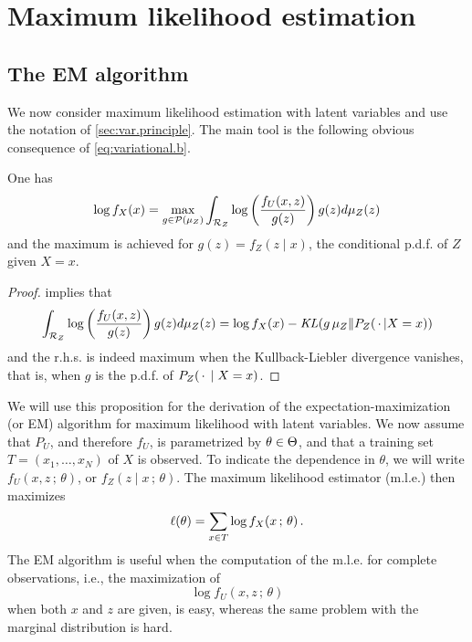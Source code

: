 \section{Maximum likelihood estimation}

%
% 

\subsection{The EM algorithm}
We now consider maximum likelihood estimation with latent variables and use the notation of \cref{sec:var.principle}. The main tool is the following obvious consequence of \cref{eq:variational.b}.
 \begin{proposition}
 \label{prop:var.bayes}
 One has
 \[
\log f_X(x) = \max_{g\in {\mathcal P}(\mu_Z)} \int_{{\mathcal R}_Z} \log \left(\frac{f_U(x,
z)}{g(z)}\right) g(z) d\mu_Z(z)
\]  
and the maximum is achieved for $g(z) = f_Z(z\mid x)$, the conditional p.d.f. of $Z$ given $X=x$.
 \end{proposition}
 \begin{proof}
  implies that 
 \[
 \int_{{\mathcal R}_Z} \log \left(\frac{f_U(x,
z)}{g(z)}\right) g(z) d\mu_Z(z) = \log f_X(x) - \mathit{KL}(g\,\mu_Z\|P_Z(\,\cdot\,|X=x))
\]
and the r.h.s. is indeed maximum when the Kullback-Liebler divergence vanishes, that is, when $g$ is the p.d.f. of  $P_Z(\,\cdot\,\mid X=x)$.
\end{proof}

We will use this proposition for the derivation of the expectation-maxi\-mi\-zation (or EM) algorithm for maximum likelihood with latent variables. We now assume that  
 $P_U$, and therefore $f_U$, is parametrized by $\theta\in \Theta$, and that a training set  $T = (x_1, \ldots, x_N)$ of $X$ is observed. To indicate the dependence in $\theta$, we will write $f_U(x,z\,;\,\theta)$, or $f_Z(z\mid x\,;\,\theta)$.
  The maximum likelihood estimator (m.l.e.) then maximizes
 \[
 \ell(\theta) = \sum_{x\in T} \log f_X(x\,;\,\theta)\,.
 \]
 The EM algorithm is useful when the
computation of the m.l.e. for complete observations, i.e., the maximization
of 
\[
 \log f_U(x, z\,;\,\theta)
\]
when both $x$ and $z$ are given, is easy, whereas the same problem with the marginal distribution
is hard.
   
